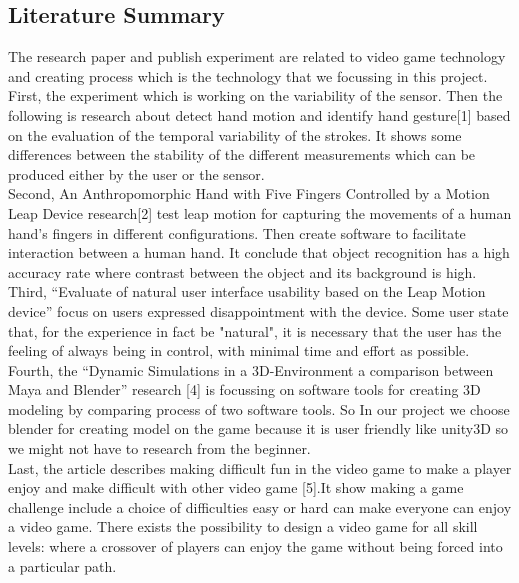 \documentclass[12pt, oneside]{article}										%
\begin{document}
\begin{multicols*}{2}
        
    \section{Literature Summary}                                            %

    The research paper and publish experiment are related to video game 
    technology and creating process which is the technology that we 
    focussing in this project. First, the experiment which is working 
    on the variability of the sensor. Then the following is research 
    about detect hand motion and identify hand gesture[1] based on 
    the evaluation of the temporal variability of the strokes. It 
    shows some differences between the stability of the different 
    measurements which can be produced either by the user or the 
    sensor. \\

    Second, An Anthropomorphic Hand with Five Fingers 
    Controlled by a Motion Leap Device research[2] test leap motion 
    for capturing the movements of a human hand's fingers in different 
    configurations. Then create software to facilitate interaction 
    between a human hand. It conclude that object recognition has 
    a high accuracy rate where contrast between the object and its 
    background is high. \\
    
    Third, “Evaluate of natural user interface 
    usability based on the Leap Motion device” focus on users expressed 
    disappointment with the device. Some user state that, for the 
    experience in fact be "natural", it is necessary that the user has 
    the feeling of always being in control, with minimal time and 
    effort as possible. \\
    
    Fourth, the “Dynamic Simulations in a 3D-Environment 
    a comparison between Maya and Blender” research [4] is focussing on 
    software tools for creating 3D modeling by comparing process of two 
    software tools. So In our project we choose blender for creating model 
    on the game because it is user friendly like unity3D so we might not have 
    to research from the beginner. \\
    
    Last, the article describes making 
    difficult fun in the video game to make a player enjoy and make difficult 
    with other video game [5].It show making a game challenge include a choice 
    of difficulties easy or hard can make everyone can enjoy a video game. 
    There exists the possibility to design a video game for all skill 
    levels: where a crossover of players can enjoy the game without 
    being forced into a particular path.


\end{multicols*}
\end{document}
